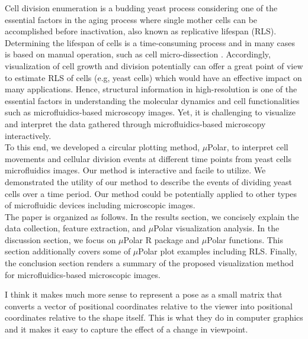 \documentclass[conference]{IEEEtran}
\begin{document}
Cell division enumeration is a budding yeast process considering one of the essential factors in the aging process where single mother cells can be accomplished before inactivation, also known as replicative lifespan (RLS). Determining the lifespan of cells is a time-consuming process and in many cases is based on manual operation, such as cell micro-dissection \cite{ref08}. Accordingly, visualization of cell growth and division potentially can offer a great point of view to estimate RLS of cells (e.g, yeast cells) which would have an effective impact on many applications. Hence, structural information in high-resolution is one of the essential factors in understanding the molecular dynamics and cell functionalities such as microfluidics-based microscopy images. Yet, it is challenging to visualize and interpret the data gathered through microfluidics-based microscopy interactively.\\

To this end, we developed a circular plotting method, $\mu$Polar, to interpret cell movements and cellular division events at different time points from yeast cells microfluidics images. Our method is interactive and facile to utilize. We demonstrated the utility of our method to describe the events of dividing yeast cells over a time period. Our method could be potentially applied to other types of microfluidic devices including microscopic images.\\

The paper is organized as follows. In the results section, we concisely explain the data collection, feature extraction, and $\mu$Polar visualization analysis. In the discussion section, we focus on $\mu$Polar R package and $\mu$Polar functions. This section additionally covers some of $\mu$Polar plot examples including RLS. Finally, the conclusion section renders a summary of the proposed visualization method for microfluidics-based microscopic images.

 
 I think it makes much more sense to represent a pose as a small matrix that converts a vector of positional coordinates relative to the viewer into positional coordinates relative to the shape itself. This is what they do in computer graphics and it makes it easy to capture the effect of a change in viewpoint.
 
 
 
 
\end{document}
